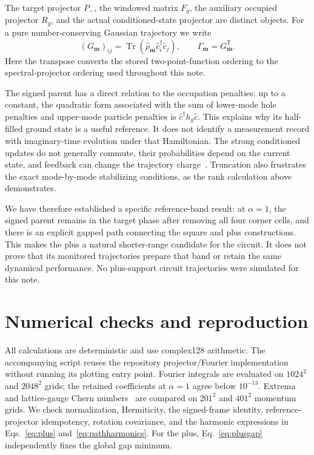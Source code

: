 \documentclass[aps,prb,onecolumn,nofootinbib,superscriptaddress]{revtex4-2}
\begin{document}
The target projector $P_-$, the windowed matrix $F_g$, the auxiliary occupied projector $R_g$, and the actual conditioned-state projector are distinct objects. For a pure number-conserving Gaussian trajectory we write
\begin{equation}
 (G_{\boldsymbol m})_{ij}=\operatorname{Tr}(\hat\rho_{\boldsymbol m}\hat c_i^\dagger\hat c_j),
 \qquad\Gamma_{\boldsymbol m}=G_{\boldsymbol m}^{\mathsf T}.
\end{equation}
Here the transpose converts the stored two-point-function ordering to the spectral-projector ordering used throughout this note.

The signed parent has a direct relation to the occupation penalties: up to a constant, the quadratic form associated with the sum of lower-mode hole penalties and upper-mode particle penalties is $\hat c^\dagger h_g\hat c$. This explains why its half-filled ground state is a useful reference. It does not identify a measurement record with imaginary-time evolution under that Hamiltonian. The strong conditioned updates do not generally commute, their probabilities depend on the current state, and feedback can change the trajectory charge~\cite{BPJ}. Truncation also frustrates the exact mode-by-mode stabilizing conditions, as the rank calculation above demonstrates.

We have therefore established a specific reference-band result: at $\alpha=1$, the signed parent remains in the target phase after removing all four corner cells, and there is an explicit gapped path connecting the square and plus constructions. This makes the plus a natural shorter-range candidate for the circuit. It does not prove that its monitored trajectories prepare that band or retain the same dynamical performance. No plus-support circuit trajectories were simulated for this note.

\appendix
\section{Numerical checks and reproduction}

All calculations are deterministic and use complex128 arithmetic. The accompanying script reuses the repository projector/Fourier implementation without running its plotting entry point. Fourier integrals are evaluated on $1024^2$ and $2048^2$ grids; the retained coefficients at $\alpha=1$ agree below $10^{-13}$. Extrema and lattice-gauge Chern numbers~\cite{Fukui2005} are compared on $201^2$ and $401^2$ momentum grids. We check normalization, Hermiticity, the signed-frame identity, reference-projector idempotency, rotation covariance, and the harmonic expressions in Eqs.~\eqref{eq:plus} and~\eqref{eq:pathharmonics}. For the plus, Eq.~\eqref{eq:plusgap} independently fixes the global gap minimum.
\end{document}
